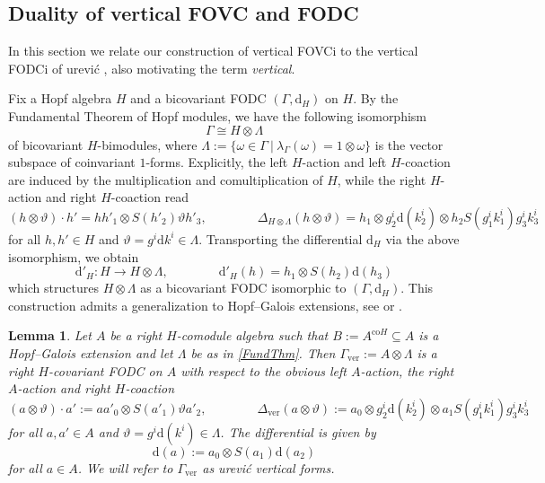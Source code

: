 \documentclass{article}
\newtheorem{lemma}[thm]{Lemma}
\theoremstyle{definition}
\begin{document}
\subsection{Duality of vertical FOVC and FODC}\label{sec:duality}

In this section we relate our construction of vertical FOVCi to the vertical FODCi of \DJ ur\dj evi\'c \cite{DurII}, also motivating the term \textit{vertical}. 


Fix a Hopf algebra $H$ and a bicovariant FODC $(\Gamma,\mathrm{d}_H)$ on $H$. By the Fundamental Theorem of Hopf modules, we have the following isomorphism
\begin{equation}\label{FundThm}
	\Gamma \cong H \otimes \Lambda
\end{equation}
of bicovariant $H$-bimodules, where $\Lambda:=\{\omega\in\Gamma~|~\lambda_\Gamma(\omega)=1\otimes\omega\}$ is the vector subspace of coinvariant $1$-forms. Explicitly, the left $H$-action and left $H$-coaction are induced by the multiplication and comultiplication of $H$, while the right $H$-action and right $H$-coaction read
$$
(h\otimes\vartheta)\cdot h'=hh'_1\otimes S(h'_2)\vartheta h'_3,\qquad\qquad
\Delta_{H\otimes\Lambda}(h\otimes\vartheta)
=h_1\otimes g^i_2\mathrm{d}(k^i_2)\otimes h_2S(g^i_1k^i_1)g^i_3k^i_3
$$
for all $h,h'\in H$ and $\vartheta=g^i\mathrm{d}k^i\in\Lambda$. Transporting the differential $\mathrm{d}_H$ via the above isomorphism, we obtain
$$
\mathrm{d}'_H\colon H\to H\otimes\Lambda,\qquad\qquad
\mathrm{d}'_H(h)=h_1\otimes S(h_2)\mathrm{d}(h_3)
$$
which structures $H\otimes\Lambda$ as a bicovariant FODC isomorphic to $(\Gamma,\mathrm{d}_H)$. This construction admits a generalization to Hopf--Galois extensions, see \cite[Lemma 3.1]{DurII} or \cite[Proposition 3.17]{AntEmaTho}.
\begin{lemma}
	Let $A$ be a right $H$-comodule algebra such that $B:=A^{\mathrm{co}H}\subseteq A$ is a Hopf--Galois extension and let $\Lambda$ be as in \eqref{FundThm}. Then $\Gamma_\mathrm{ver}:=A\otimes\Lambda$ is a right $H$-covariant FODC on $A$ with respect to the obvious left $A$-action, the right $A$-action and right $H$-coaction
	\begin{equation}\label{verRight}
		(a\otimes\vartheta)\cdot a'
		:=aa'_0\otimes S(a'_1)\vartheta a'_2,\qquad\qquad
		\Delta_\mathrm{ver}(a\otimes\vartheta)
		:=a_0\otimes g^i_2\mathrm{d}(k^i_2)\otimes a_1S(g^i_1k^i_1)g^i_3k^i_3
	\end{equation}
	for all $a,a'\in A$ and $\vartheta=g^i\mathrm{d}(k^i)\in\Lambda$. The differential is given by
	\begin{equation}
		\mathrm{d}(a):=a_0\otimes S(a_1)\mathrm{d}(a_2)
	\end{equation}
	for all $a\in A$. We will refer to $\Gamma_{\textrm{ver}}$ as \DJ ur\dj evi\'c vertical forms.
\end{lemma}
\end{document}
